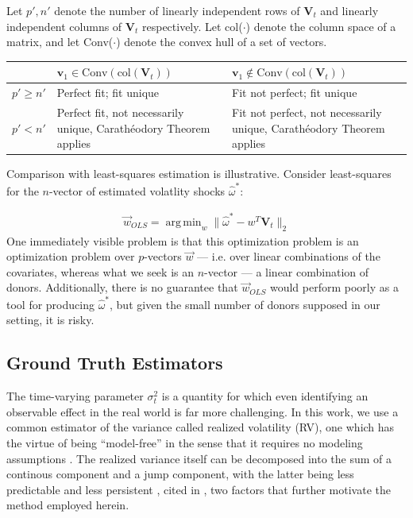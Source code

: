 \documentclass[11pt,3p,review,authoryear]{elsarticle}
\newcommand{\V}{\textbf{V}}
\DeclareMathOperator*{\argmin}{arg\,min} %
\theoremstyle{definition}
\begin{document}
Let $p', n'$ denote the number of linearly independent rows of $\V_{t}$ and linearly independent columns of $\V_{t}$ respectively.  Let col($\cdot$) denote the column space of a matrix, and let Conv($\cdot$) denote the convex hull of a set of vectors.  \\

    \begin{center}
      \begin{tabular}{ | m{3em} | m{7cm}| m{7cm} | } 
        \hline
        & $\textbf{v}_{1}\in \text{Conv}(\text{col}(\V_{t}))$ & $\textbf{v}_{1} \notin \text{Conv}(\text{col}(\V_{t}))$\\ 
        \hline
        $p' \geq n'$ & Perfect fit; fit unique & Fit not perfect; fit unique \\
        \hline
        $p' < n'$ & Perfect fit, not necessarily unique, Carath\'eodory Theorem applies \citep{abadie2022synthetic}& Fit not perfect, not necessarily unique, Carath\'eodory Theorem applies \\ 
        \hline
      \end{tabular}
      \end{center} 

Comparison with least-squares estimation is illustrative.  Consider least-squares for the $n$-vector of estimated volatlity shocks $\hat\omega^{*}$:

\begin{align*}
\vec{w}_{OLS}=\argmin_{{w}} \|\hat{\omega}^{*} - w^{T}\textbf{V}_{t}\|_{2}
\end{align*} 
One immediately visible problem is that this optimization problem is an optimization problem over $p$-vectors $\vec{w}$ --- i.e. over linear combinations of the covariates, whereas what we seek is an $n$-vector --- a linear combination of donors.  Additionally, there is no guarantee that $\vec{w}_{OLS}$ would perform poorly as a tool for producing $\hat\omega^{*}$, but given the small number of donors supposed in our setting, it is risky.
    \subsection{Ground Truth Estimators}
    \label{Ground Truth Estimators}
    
    The time-varying parameter $\sigma^{2}_{t}$ is a quantity for which even identifying an observable effect in the real world is far more challenging.  In this work, we use a common estimator of the variance called realized volatility (RV), one which has the virtue of being ``model-free'' in the sense that it requires no modeling assumptions \citep{andersen2010stochastic}.  The realized variance itself can be decomposed into the sum of a continous component and a jump component, with the latter being less predictable and less persistent \citep{andersen2007roughing}, cited in \citet{de2006forecasting}, two factors that further motivate the method employed herein.
    
\end{document}
